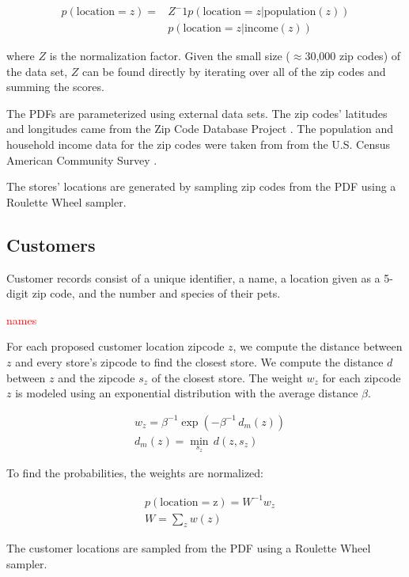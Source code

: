 \documentclass[conference]{IEEEtran}
\begin{document}
\begin{align}
p(\text{location}=z) = &Z^-1 p(\text{location}=z | \text{population}(z)) \nonumber \\
&p(\text{location}=z | \text{income}(z))
\end{align}


where $Z$ is the normalization factor.  Given the small size ($\approx$30,000 zip codes) of the data set, $Z$ can be found directly by iterating over all of the zip codes and summing the scores.

The PDFs are parameterized using external data sets.  The zip codes' latitudes and longitudes came from the Zip Code Database Project \cite{Zips}.  The population and household income data for the zip codes were taken from from the U.S. Census American Community Survey \cite{ACS}. 

The stores' locations are generated by sampling zip codes from the PDF using a Roulette Wheel sampler.

\subsection{Customers}

Customer records consist of a unique identifier, a name, a location given as a 5-digit zip code, and the number and species of their pets.

\textcolor{red}{names}

For each proposed customer location zipcode $z$, we compute the distance between $z$ and every store's zipcode to find the closest store.  We compute the distance $d$ between $z$ and the zipcode $s_z$ of the closest store.  The weight $w_z$ for each zipcode $z$ is modeled using an exponential distribution with the average distance $\beta$.

\begin{align}
&w_z = \beta^{-1} \exp(-\beta^{-1} \, d_m(z)) \\
&d_m(z) = \min_{s_z} \, d(z, s_z) \nonumber
\end{align}

To find the probabilities, the weights are normalized:

\begin{align}
&p(\text{location} = \text{z}) = W^{-1} w_z \\
&W = \sum_{z} w(z) \nonumber
\end{align}

The customer locations are sampled from the PDF using a Roulette Wheel sampler.
\end{document}
